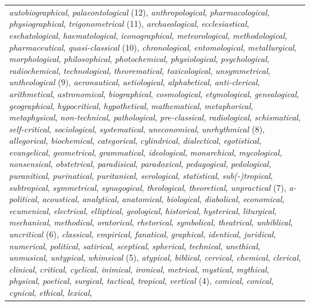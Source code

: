 \begin{table}[!htbp]
{\begin{tabular}[t]{l}
{\begin{minipage}[t]{\textwidth}
\textit{autobiographical}, \textit{palaeontological} (12), \textit{anthropological}, \textit{pharmacological}, \textit{physiographical}, \textit{trigonometrical} (11), \textit{archaeological}, \textit{ecclesiastical}, \textit{eschatological}, \textit{haematological}, \textit{iconographical}, \textit{meteorological}, \textit{methodological}, \textit{pharmaceutical}, \textit{quasi-classical} (10), \textit{chronological}, \textit{entomological}, \textit{metallurgical}, \textit{morphological}, \textit{philosophical}, \textit{photochemical}, \textit{physiological}, \textit{psychological}, \textit{radiochemical}, \textit{technological}, \textit{theorematical}, \textit{toxicological}, \textit{unsymmetrical}, \textit{untheological} (9), \textit{aeronautical}, \textit{aetiological}, \textit{alphabetical}, \textit{anti-clerical}, \textit{arithmetical}, \textit{astronomical}, \textit{biographical}, \textit{cosmological}, \textit{etymological}, \textit{genealogical}, \textit{geographical}, \textit{hypocritical}, \textit{hypothetical}, \textit{mathematical}, \textit{metaphorical}, \textit{metaphysical}, \textit{non-technical}, \textit{pathological}, \textit{pre-classical}, \textit{radiological}, \textit{schismatical}, \textit{self-critical}, \textit{sociological}, \textit{systematical}, \textit{uneconomical}, \textit{unrhythmical} (8), \textit{allegorical}, \textit{biochemical}, \textit{categorical}, \textit{cylindrical}, \textit{dialectical}, \textit{egotistical}, \textit{evangelical}, \textit{geometrical}, \textit{grammatical}, \textit{ideological}, \textit{monarchical}, \textit{mycological}, \textit{nonsensical}, \textit{obstetrical}, \textit{paradisical}, \textit{paradoxical}, \textit{pedagogical}, \textit{pedological}, \textit{puranitical}, \textit{purinatical}, \textit{puritanical}, \textit{serological}, \textit{statistical}, \textit{sub(-)tropical}, \textit{subtropical}, \textit{symmetrical}, \textit{synagogical}, \textit{theological}, \textit{theoretical}, \textit{unpractical} (7), \textit{a-political}, \textit{acoustical}, \textit{analytical}, \textit{anatomical}, \textit{biological}, \textit{diabolical}, \textit{economical}, \textit{ecumenical}, \textit{electrical}, \textit{elliptical}, \textit{geological}, \textit{historical}, \textit{hysterical}, \textit{liturgical}, \textit{mechanical}, \textit{methodical}, \textit{oratorical}, \textit{rhetorical}, \textit{symbolical}, \textit{theatrical}, \textit{unbiblical}, \textit{uncritical} (6), \textit{classical}, \textit{empirical}, \textit{fanatical}, \textit{graphical}, \textit{identical}, \textit{juridical}, \textit{numerical}, \textit{political}, \textit{satirical}, \textit{sceptical}, \textit{spherical}, \textit{technical}, \textit{unethical}, \textit{unmusical}, \textit{untypical}, \textit{whimsical} (5), \textit{atypical}, \textit{biblical}, \textit{cervical}, \textit{chemical}, \textit{clerical}, \textit{clinical}, \textit{critical}, \textit{cyclical}, \textit{inimical}, \textit{ironical}, \textit{metrical}, \textit{mystical}, \textit{mythical}, \textit{physical}, \textit{poetical}, \textit{surgical}, \textit{tactical}, \textit{tropical}, \textit{vertical} (4), \textit{comical}, \textit{conical}, \textit{cynical}, \textit{ethical}, \textit{lexical}, 
\end{minipage}}
\end{tabular}}
\end{table}
